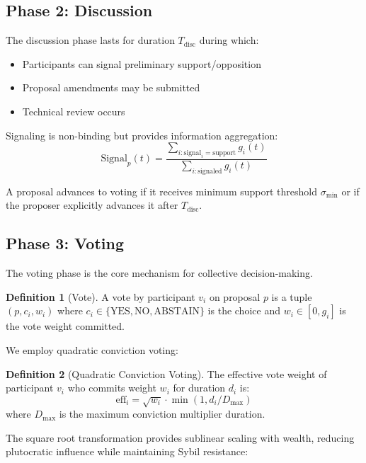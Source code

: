 \documentclass[11pt,a4paper]{article}
\theoremstyle{definition}
\newtheorem{definition}{Definition}[section]
\theoremstyle{remark}
\begin{document}
\subsection{Phase 2: Discussion}

The discussion phase lasts for duration $T_{\text{disc}}$ during which:
\begin{itemize}
    \item Participants can signal preliminary support/opposition
    \item Proposal amendments may be submitted
    \item Technical review occurs
\end{itemize}

Signaling is non-binding but provides information aggregation:
\begin{equation}
    \text{Signal}_p(t) = \frac{\sum_{i: \text{signal}_i = \text{support}} g_i(t)}{\sum_{i: \text{signaled}} g_i(t)}
\end{equation}

A proposal advances to voting if it receives minimum support threshold $\sigma_{\min}$ or if the proposer explicitly advances it after $T_{\text{disc}}$.

\subsection{Phase 3: Voting}

The voting phase is the core mechanism for collective decision-making.

\begin{definition}[Vote]
A vote by participant $v_i$ on proposal $p$ is a tuple $(p, c_i, w_i)$ where $c_i \in \{\text{YES}, \text{NO}, \text{ABSTAIN}\}$ is the choice and $w_i \in [0, g_i]$ is the vote weight committed.
\end{definition}

We employ quadratic conviction voting:

\begin{definition}[Quadratic Conviction Voting]
The effective vote weight of participant $v_i$ who commits weight $w_i$ for duration $d_i$ is:
\begin{equation}
    \text{eff}_i = \sqrt{w_i} \cdot \min(1, d_i / D_{\max})
\end{equation}
where $D_{\max}$ is the maximum conviction multiplier duration.
\end{definition}

The square root transformation provides sublinear scaling with wealth, reducing plutocratic influence while maintaining Sybil resistance:
\end{document}
